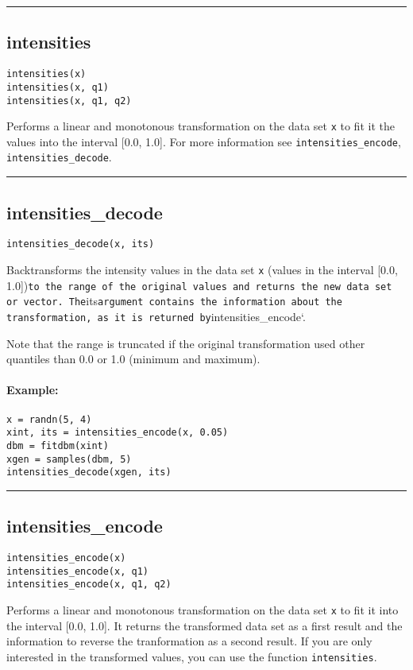 \noindent\rule{\textwidth}{1pt}
\subsection*{intensities}
\begin{verbatim}
intensities(x)
intensities(x, q1)
intensities(x, q1, q2)
\end{verbatim}
Performs a linear and monotonous transformation on the data set \texttt{x} to fit it the values into the interval [0.0, 1.0]. For more information see \texttt{intensities\_encode}, \texttt{intensities\_decode}.

\noindent\rule{\textwidth}{1pt}
\subsection*{intensities\_decode}
\begin{verbatim}
intensities_decode(x, its)
\end{verbatim}
Backtransforms the intensity values in the data set \texttt{x} (values in the interval [0.0, 1.0])\texttt{to the range of the original values and returns the new data set or vector. The}its\texttt{argument contains the information about the transformation, as it is returned by}intensities\_encode`.

Note that the range is truncated if the original transformation used other quantiles than 0.0 or 1.0 (minimum and maximum).

\paragraph*{Example:}
\begin{verbatim}
x = randn(5, 4)
xint, its = intensities_encode(x, 0.05)
dbm = fitdbm(xint)
xgen = samples(dbm, 5)
intensities_decode(xgen, its)
\end{verbatim}
\noindent\rule{\textwidth}{1pt}
\subsection*{intensities\_encode}
\begin{verbatim}
intensities_encode(x)
intensities_encode(x, q1)
intensities_encode(x, q1, q2)
\end{verbatim}
Performs a linear and monotonous transformation on the data set \texttt{x} to fit it into the interval [0.0, 1.0]. It returns the transformed data set as a first result and the information to reverse the tranformation as a second result. If you are only interested in the transformed values, you can use the function \texttt{intensities}.

